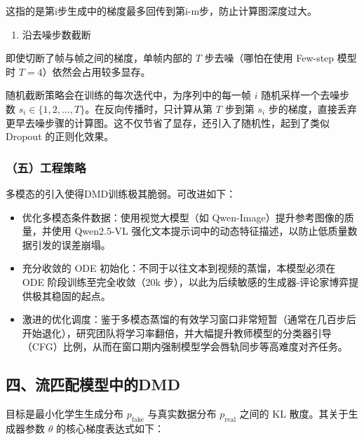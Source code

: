 这指的是第i步生成中的梯度最多回传到第i-m步，防止计算图深度过大。

\begin{enumerate}
\def\labelenumi{\arabic{enumi}.}
\setcounter{enumi}{1}
\tightlist
\item
  沿去噪步数截断
\end{enumerate}

即使切断了帧与帧之间的梯度，单帧内部的 \(T\) 步去噪（哪怕在使用 Few-step 模型时 \(T=4\)）依然会占用较多显存。

随机截断策略会在训练的每次迭代中，为序列中的每一帧 \(i\) 随机采样一个去噪步数 \(s_i\in\{1,2,\ldots,T\}\)。在反向传播时，只计算从第 \(T\) 步到第 \(s_i\) 步的梯度，直接丢弃更早去噪步骤的计算图。这不仅节省了显存，还引入了随机性，起到了类似 Dropout 的正则化效果。

\hypertarget{ux4e94ux5de5ux7a0bux7b56ux7565}{%
\subsubsection{（五）工程策略}\label{ux4e94ux5de5ux7a0bux7b56ux7565}}

多模态的引入使得DMD训练极其脆弱。可改进如下：

\begin{itemize}
\tightlist
\item
  优化多模态条件数据：使用视觉大模型（如 Qwen-Image）提升参考图像的质量，并使用 Qwen2.5-VL 强化文本提示词中的动态特征描述，以防止低质量数据引发的误差崩塌。
\item
  充分收敛的 ODE 初始化：不同于以往文本到视频的蒸馏，本模型必须在 ODE 阶段训练至完全收敛（20k 步），以此为后续敏感的生成器-评论家博弈提供极其稳固的起点。
\item
  激进的优化调度：鉴于多模态蒸馏的有效学习窗口非常短暂（通常在几百步后开始退化），研究团队将学习率翻倍，并大幅提升教师模型的分类器引导（CFG）比例，从而在窗口期内强制模型学会唇轨同步等高难度对齐任务。
\end{itemize}

\hypertarget{ux56dbux6d41ux5339ux914dux6a21ux578bux4e2dux7684dmd}{%
\subsection{四、流匹配模型中的DMD}\label{ux56dbux6d41ux5339ux914dux6a21ux578bux4e2dux7684dmd}}

目标是最小化学生生成分布 \(p_{\mathrm{fake}}\) 与真实数据分布 \(p_{\mathrm{real}}\) 之间的 KL 散度。其关于生成器参数 \(\theta\) 的核心梯度表达式如下：

